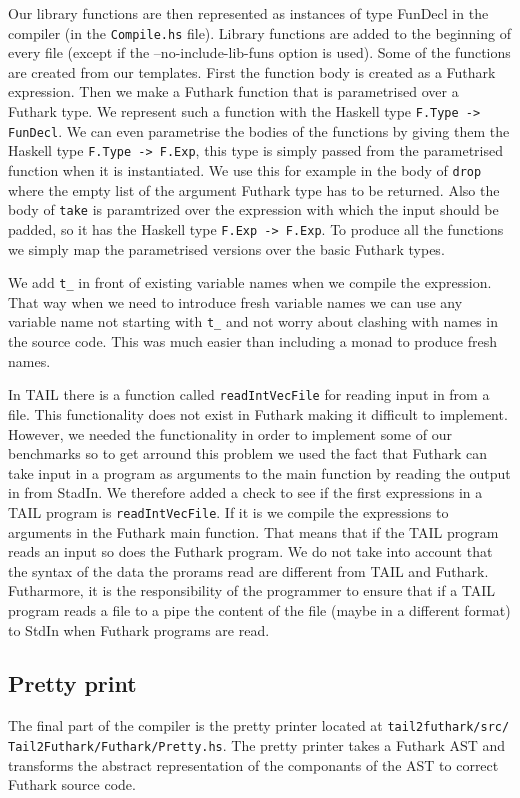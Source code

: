 \documentclass[11pt]{article}
\begin{document}
Our library functions are then represented as instances of type FunDecl in the compiler (in the {\tt Compile.hs} file).
Library functions are added to the beginning of every file (except if the --no-include-lib-funs option is used). 
Some of the functions are created from our templates. First the function body is created as a Futhark expression.
Then we make a Futhark function that is parametrised over a Futhark type. We represent such a function with the Haskell type {\tt F.Type -> FunDecl}.
We can even parametrise the bodies of the functions by giving them the Haskell type {\tt F.Type -> F.Exp}, this type is simply passed from the parametrised function when it is instantiated.
We use this for example in the body of {\tt drop} where the empty list of the argument Futhark type has to be returned.
Also the body of {\tt take} is paramtrized over the expression with which the input should be padded, so it has the Haskell type {\tt F.Exp -> F.Exp}.
To produce all the functions we simply map the parametrised versions over the basic Futhark types. 

We add {\tt t\_} in front of existing variable names when we compile the expression. That way when we need to introduce fresh variable names we can use any variable name not starting with {\tt t\_} and not worry about clashing with names in the source code. This was much easier than including a monad to produce fresh names. 

In TAIL there is a function called {\tt readIntVecFile} for reading input in from a file. This functionality does not exist in Futhark making it difficult to implement. However, we needed the functionality in order to implement some of our benchmarks so to get arround this problem we used the fact that Futhark can take input in a program as arguments to the main function by reading the output in from StadIn. We therefore added a check to see if the first expressions in a TAIL program is {\tt readIntVecFile}. If it is we compile the expressions to arguments in the Futhark main function. That means that if the TAIL program reads an input so does the Futhark program. We do not take into account that the syntax of the data the prorams read are different from TAIL and Futhark. Futharmore, it is the responsibility of the programmer to ensure that if a TAIL program reads a file to a pipe the content of the file (maybe in a different format) to StdIn when Futhark programs are read. 


\subsection{Pretty print}
The final part of the compiler is the pretty printer located at {\tt tail2futhark/src/
Tail2Futhark/Futhark/Pretty.hs}. 
The pretty printer takes a Futhark AST and transforms the abstract representation of the componants of the AST to correct Futhark source code. 
\end{document}
